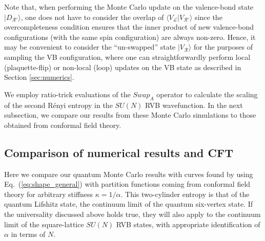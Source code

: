 \documentclass[11pt]{iopart}
\begin{document}
Note that, when performing the Monte Carlo update on the valence-bond state $| D_{\mathcal{R} '} \rangle$, one does not have to consider the overlap of $\langle V_{\mathcal{L}} | V_{\mathcal{R}'} \rangle$ since the overcompleteness condition ensures that the inner product of new valence-bond configurations (with the same spin configuration) are always non-zero.  Hence, it may be convenient to consider the ``un-swapped'' state $|V_{\mathcal R} \rangle$ for the purposes of sampling the VB configuration, where one can straightforwardly perform local (plaquette-flip) or non-local (loop) updates on the VB state as described in 
Section \ref{sec:numerics}.

We employ ratio-trick evaluations of the $Swap_A$ operator to calculate the scaling of the second R\'enyi entropy in the $SU(N)$ RVB wavefunction.  In the next subsection, we compare our results from these Monte Carlo simulations to those obtained from conformal field theory.


\subsection{Comparison of numerical results and CFT}

Here we compare our quantum Monte Carlo results with curves found by using Eq.~(\ref{eq:shape_general}) with partition functions coming from conformal field theory for arbitrary stiffness $\kappa=1/\alpha$. This two-cylinder entropy is that of the quantum Lifshitz state, the continuum limit of the quantum six-vertex state. If the universality discussed above holds true, they will also apply to the continuum limit of the square-lattice $SU(N)$ RVB states, with appropriate identification of $\alpha$ in terms of $N$.
\end{document}
